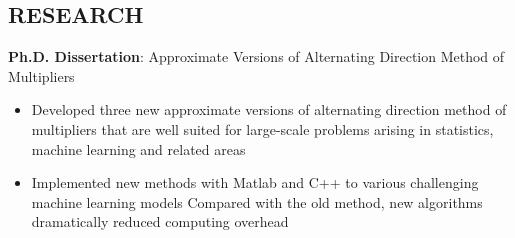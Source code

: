 \documentclass[10.5pt]{res} %
\begin{document}
\begin{resume}
\section{RESEARCH} \parskip 11pt
	\textbf{Ph.D. Dissertation}: Approximate Versions of Alternating Direction Method of Multipliers
	\begin{itemize}\itemsep -1pt
		\item Developed three new %
		 approximate versions of alternating direction method of multipliers that are well suited for large-scale problems arising in statistics, machine learning and  related areas%
		\item Implemented new methods with Matlab and C++ to various challenging machine learning models %
		Compared with the old method, new algorithms dramatically reduced computing overhead
	\end{itemize}
%

\end{resume}
\end{document}
